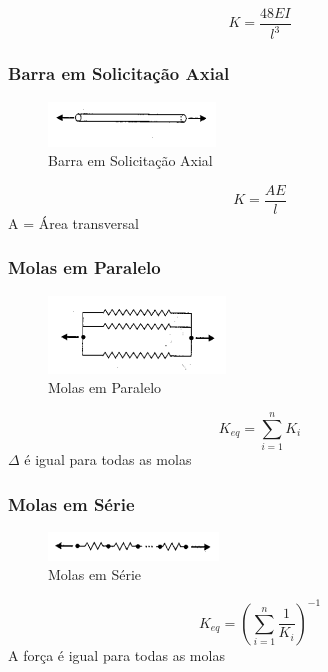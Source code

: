 \documentclass[a4paper, 12pt]{article}
\begin{document}
	\begin{equation}
	K = \frac{48EI}{l^3}
	\end{equation}

\subsubsection{Barra em Solicitação Axial}
	\begin{figure}[h]
	\centering
	\includegraphics[scale=1.5]{a3.png}
	\caption{Barra em Solicitação Axial}
	\end{figure}
	
	\begin{equation}
	K = \frac{AE}{l}
	\end{equation}	
	A = Área transversal
	
\newpage
\subsubsection{Molas em Paralelo}
	\begin{figure}[h]
	\centering
	\includegraphics[scale=1.5]{a4.png}
	\caption{Molas em Paralelo}
	\end{figure}
	
	\begin{equation}
	K_{eq} = \sum^n_{i =1} K_i
	\end{equation}
	$\Delta$ é igual para todas as molas
	
\subsubsection{Molas em Série}
	\begin{figure}[h]
	\centering
	\includegraphics[scale=1.5]{a5.png}
	\caption{Molas em Série}
	\end{figure}
	
	\begin{equation}
	K_{eq} = (\sum^n_{i = 1}\frac{1}{K_i})^{-1}
	\end{equation}
	A força é igual para todas as molas
	
\end{document}
